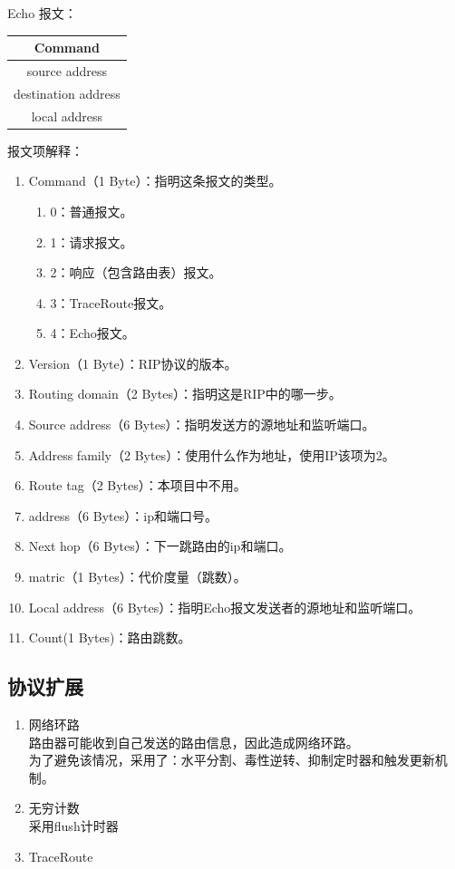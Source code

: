 	Echo 报文：
	\begin{table}[H]
	\centering
		\begin{tabular}{|c|}
			\hline
			Command \\
			\hline
			source address \\
			\hline
			destination address \\
			\hline
			local address \\
			\hline
		\end{tabular}		
	\end{table}
	报文项解释：
	\begin{enumerate}
		\item Command（1 Byte）：指明这条报文的类型。
		\begin{enumerate}[]
			\item 0：普通报文。
			\item 1：请求报文。
			\item 2：响应（包含路由表）报文。
			\item 3：TraceRoute报文。
			\item 4：Echo报文。
		\end{enumerate}
		\item Version（1 Byte）：RIP协议的版本。
		\item Routing domain（2 Bytes）：指明这是RIP中的哪一步。
		\item Source address（6 Bytes）：指明发送方的源地址和监听端口。
		\item Address family（2 Bytes）：使用什么作为地址，使用IP该项为2。
		\item Route tag（2 Bytes）：本项目中不用。
		\item address（6 Bytes）：ip和端口号。
		\item Next hop（6 Bytes）：下一跳路由的ip和端口。
		\item matric（1 Bytes）：代价度量（跳数）。
		\item Local address（6 Bytes）：指明Echo报文发送者的源地址和监听端口。
		\item Count(1 Bytes)：路由跳数。
	\end{enumerate}
	\subsection{协议扩展} %
	\label{sub:协议扩展}
		\begin{enumerate}
			\item 网络环路\\
				路由器可能收到自己发送的路由信息，因此造成网络环路。\\
				为了避免该情况，采用了：水平分割、毒性逆转、抑制定时器和触发更新机制。
			\item 无穷计数\\
				采用flush计时器
			\item TraceRoute
		\end{enumerate}
